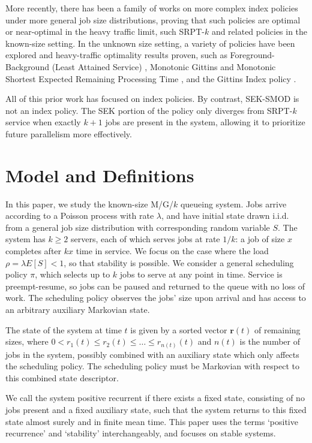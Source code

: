 \documentclass[acmsmall]{acmart}
\newcommand{\rb}{\boldsymbol{r}}
\begin{document}
More recently, there has been a family of works on more complex index policies under more general job size distributions, proving that such policies are optimal or near-optimal in the heavy traffic limit, such SRPT-$k$ and related policies \cite{grosof-etal-2019-srpt-k} in the known-size setting. In the unknown size setting, a variety of policies have been explored and heavy-traffic optimality results proven, such as Foreground-Background (Least Attained Service) \cite{grosof-etal-2019-srpt-k}, Monotonic Gittins and Monotonic Shortest Expected Remaining Processing Time \cite{scully-et-al2021optimal},
and the Gittins Index policy \cite{scully-et-al2020gittins,hong-et-al2024gittins-ggk}.

All of this prior work has focused on index policies. By contrast, SEK-SMOD is not an index policy. The SEK portion of the policy only diverges from SRPT-$k$ service when exactly $k+1$ jobs are present in the system, allowing it to prioritize future parallelism more effectively.



\section{Model and Definitions}

In this paper, we study the known-size M/G/$k$ queueing system.
Jobs arrive according to a Poisson process with rate $\lambda$,
and have initial state drawn i.i.d. from a general job size distribution
with corresponding random variable $S$.
The system has $k \ge 2$ servers, each of which serves jobs at rate $1/k$: a job of size $x$ completes after $kx$ time in service.
We focus on the case where the load $\rho = \lambda E[S] < 1$, so that stability is possible.
We consider a general scheduling policy $\pi$,
which selects up to $k$ jobs to serve at any point in time.
Service is preempt-resume, so jobs can be paused and returned to the queue with no loss of work. 
The scheduling policy observes the jobs' size upon arrival and has access to an arbitrary auxiliary Markovian state.

The state of the system at time $t$ is given by a sorted vector $\rb(t)$ of remaining sizes,
where $0 < r_1(t) \le r_2(t) \le \ldots \le r_{n(t)}(t)$ and $n(t)$ is the number of jobs in the system, possibly combined with an auxiliary state which only affects the scheduling policy. The scheduling policy must be Markovian with respect to this combined state descriptor.

We call the system positive recurrent if there exists a fixed state, consisting of no jobs present and a fixed auxiliary state, such that the system returns to this fixed state almost surely and in finite mean time.
This paper uses the terms `positive recurrence' and `stability' interchangeably, and focuses on stable systems.
\end{document}
